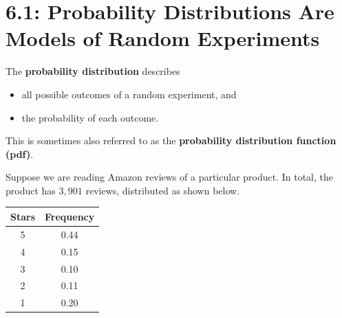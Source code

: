 \documentclass[../mathNotesPreamble]{subfiles}
\begin{document}
  \section{6.1: Probability Distributions Are Models of Random Experiments}
    \begin{defn*}
      The \textbf{probability distribution} describes
      \begin{itemize}
        \item all possible outcomes of a random experiment, and
        \item the probability of each outcome.
      \end{itemize}
      This is sometimes also referred to as the \textbf{probability distribution function (pdf)}.
    \end{defn*}
    
    \begin{ex*}
      Suppose we are reading Amazon reviews of a particular product. In total, the product has $3,901$ reviews, distributed as shown below.
    \end{ex*}
    
    \begin{center}
      \begin{minipage}{0.2\linewidth}
        \begin{tabular}{@{}cc@{}}\toprule
          Stars& Frequency\\\midrule
          5 & 0.44\\
          4 & 0.15\\
          3 & 0.10\\
          2 & 0.11\\
          1 & 0.20\\\bottomrule
        \end{tabular}
      \end{minipage}\hspace*{15mm}%
      \begin{minipage}{0.425\linewidth}
      \end{minipage}
    \end{center}
    
\end{document}
